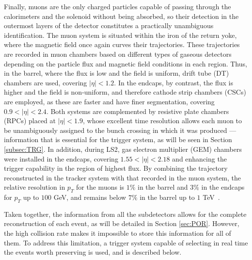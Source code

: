 Finally, muons are the only charged particles capable of passing through the calorimeters and the solenoid without being absorbed, so their detection in the outermost layers of the detector constitutes a practically unambiguous identification. The muon system is situated within the iron of the return yoke, where the magnetic field once again curves their trajectories. These trajectories are recorded in muon chambers based on different types of gaseous detectors depending on the particle flux and magnetic field conditions in each region. Thus, in the barrel, where the flux is low and the field is uniform, drift tube (DT) chambers are used, covering $|\eta|<1.2$. In the endcaps, by contrast, the flux is higher and the field is non-uniform, and therefore cathode strip chambers (CSCs) are employed, as these are faster and have finer segmentation, covering $0.9<|\eta|<2.4$. Both systems are complemented by resistive plate chambers (RPCs) placed at $|\eta|<1.9$, whose excellent time resolution allows each muon to be unambiguously assigned to the bunch crossing in which it was produced — information that is essential for the trigger system, as will be seen in Section \ref{subsec:TRG}. In addition, during LS2, gas electron multiplier (GEM) chambers were installed in the endcaps, covering $1.55<|\eta|<2.18$ and enhancing the trigger capability in the region of highest flux. By combining the trajectory reconstructed in the tracker system with that recorded in the muon system, the relative resolution in $p_T$ for the muons is $1\%$ in the barrel and $3\%$ in the endcaps for $p_T$ up to $100$ GeV, and remains below $7\%$ in the barrel up to $1$ TeV~\cite{CMS:2018rym}.\medskip

Taken together, the information from all the subdetectors allows for the complete reconstruction of each event, as will be detailed in Section \ref{sec:POR}. However, the high collision rate makes it impossible to store this information for all of them. To address this limitation, a trigger system capable of selecting in real time the events worth preserving is used, and is described below.



